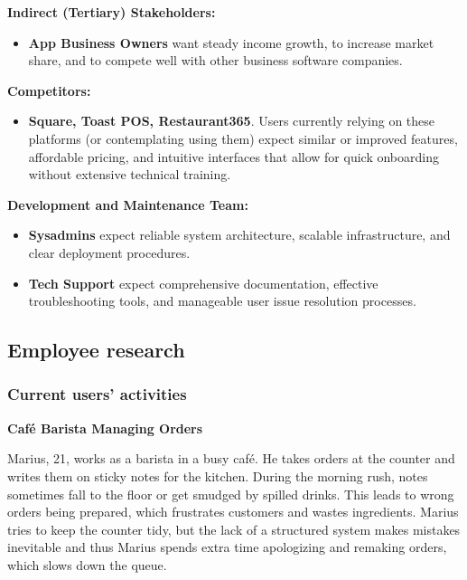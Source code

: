 \documentclass[]{VUMIFTemplateClass}
\begin{document}
\textbf{Indirect (Tertiary) Stakeholders:}
\begin{itemize}
    \item \textbf{App Business Owners} want steady income growth, to increase
    market share, and to compete well with other business software companies.
\end{itemize}

\textbf{Competitors:}
\begin{itemize}
    \item \textbf{Square, Toast POS, Restaurant365}. Users currently relying on these platforms (or contemplating using them) expect similar or improved features, affordable pricing, and intuitive interfaces that allow for quick onboarding without extensive technical training.
\end{itemize}

\textbf{Development and Maintenance Team:}
\begin{itemize}
    \item \textbf{Sysadmins} expect reliable system architecture, scalable
    infrastructure, and clear deployment procedures.
    \item \textbf{Tech Support} expect comprehensive documentation, effective
    troubleshooting tools, and manageable user issue resolution processes.
\end{itemize}


\subsection{Employee research}

\subsubsection{Current users' activities}

\textbf{Café Barista Managing Orders}

Marius, 21, works as a barista in a busy café. He takes orders at the counter and writes them on sticky notes for the kitchen. During the morning rush, notes sometimes fall to the floor or get smudged by spilled drinks. This leads to wrong orders being prepared, which frustrates customers and wastes ingredients. Marius tries to keep the counter tidy, but the lack of a structured system makes mistakes inevitable and thus Marius spends extra time apologizing and remaking orders, which slows down the queue.
\end{document}
